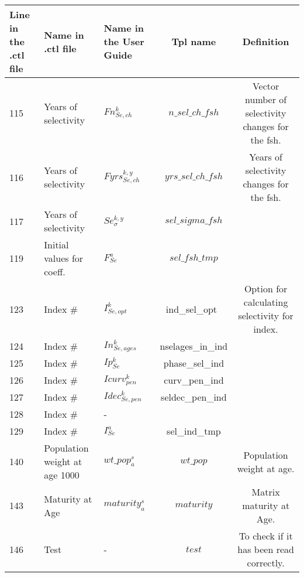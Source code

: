\documentclass{article}
\begin{document}
\begin{tabular}{| p{0.9cm} | p{4.0cm}  | p{1.9cm} | c | c |}
\hline
Line in the .ctl file & Name in .ctl file  & Name in the User Guide & Tpl name & Definition\\ \hline
115 & Years of selectivity &  $Fn_{Se,ch}^k$ & $n\_sel\_ch\_fsh$ & Vector number of selectivity changes for the fsh.\\ \hline
116 & Years of selectivity &  $Fyrs_{Se,ch}^{k,y}$ & $yrs\_sel\_ch\_fsh$ & Years of selectivity changes for the fsh.\\ \hline
117 & Years of selectivity &  $Se_{\sigma}^{k,y}$ & $sel\_sigma\_fsh$ &\\ \hline
119 & Initial values for coeff. & $F_{Se}^a$  & $sel\_fsh\_tmp$ &\\ \hline
123 & Index \# & $I_{Se,opt}^k$  & ind\_sel\_opt\ & Option for calculating selectivity for index.\\ \hline
124 & Index \# & $In_{Se,ages}^k$  & nselages\_in\_ind &\\ \hline
125 & Index \# &  $Ip_{Se}^k$ & phase\_sel\_ind &\\ \hline
126 & Index \# & $Icurv_{pen}^k$  & curv\_pen\_ind &\\ \hline
127 & Index \# & $Idec_{Se,pen}^k$  & seldec\_pen\_ind &\\ \hline
128 & Index \# & -  &  &\\ \hline
129 & Index \# & $I_{Se}^a$  & sel\_ind\_tmp &\\ \hline
140 & Population weight at age 1000& $wt\_pop^s_a$  & $wt\_pop$ & Population weight at age.\\ \hline
143 & Maturity at Age & $maturity^s_a$  & $maturity$  & Matrix maturity at Age.\\ \hline
146 & Test & -  & $test$ & To check if it has been read correctly. \\ \hline
\end{tabular}
\end{document}
